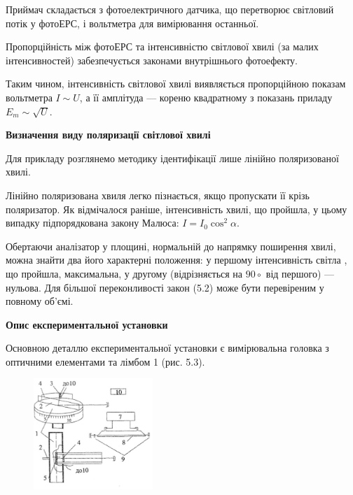 \documentclass[12pt,a4paper]{article}
\begin{document}
    Приймач складається з фотоелектричного датчика, що перетворює світловий
    потік у фотоЕРС, і вольтметра для вимірювання останньої.

    Пропорційність між фотоЕРС та інтенсивністю світлової хвилі (за малих
    інтенсивностей) забезпечується законами внутрішнього фотоефекту.

    Таким чином, інтенсивність світлової хвилі виявляється пропорційною показам
    вольтметра $I \sim U$, а її амплітуда --- кореню квадратному з показань приладу
    $E_m \sim \sqrt{U}$.

    \textbf{Визначення виду поляризації світлової хвилі}

    Для прикладу розглянемо методику ідентифікації лише лінійно поляризованої хвилі.

    Лінійно поляризована хвиля легко пізнається, якщо пропускати її крізь
    поляризатор. Як відмічалося раніше, інтенсивність хвилі, що пройшла, у цьому випадку
    підпорядкована закону Малюса: $I = I_0 \cos^2 \alpha$.

    Обертаючи аналізатор у площині,
    нормальній до напрямку поширення хвилі, можна знайти два його характерні
    положення: у першому інтенсивність світла , що пройшла, максимальна, у другому
    (відрізняється на $90 \circ$ від першого) --- нульова. Для більшої переконливості закон (5.2)
    може бути перевіреним у повному об'ємі.

    \begin{center} \textbf{Опис експериментальної установки} \end{center}

    Основною деталлю експериментальної
    установки є вимірювальна головка з оптичними
    елементами та лімбом 1 (рис. 5.3).

    \begin{figure}[!ht]

        \renewcommand{\thefigure}{5.\arabic{figure}} %

        \centering
        \includegraphics[width=0.4\textwidth]{5.3.png}
        \caption{}
        \label{fig3:schema}

    \end{figure}
\end{document}
